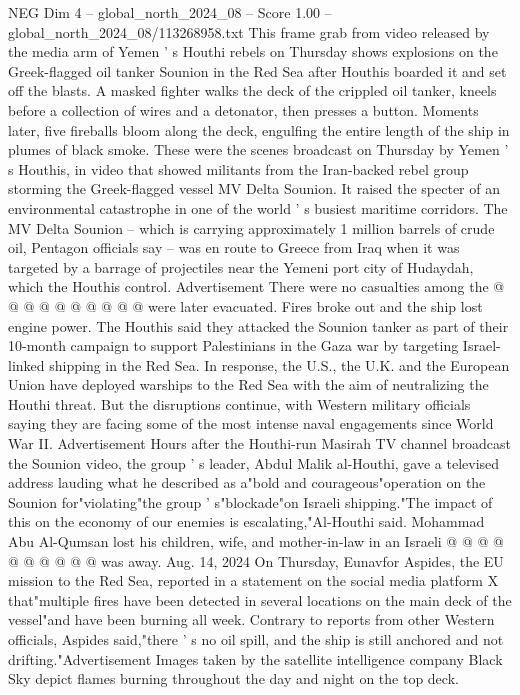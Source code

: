 \begin{textsample}{NEG Dim 4 – global\_north\_2024\_08 – Score 1.00 – global\_north\_2024\_08/113268958.txt}  \label{ex:f4_neg_295}
This frame grab from video released by the media arm of Yemen ' s Houthi rebels on Thursday shows explosions on the Greek-flagged oil tanker Sounion in the Red Sea after Houthis boarded it and set off the blasts.
A masked fighter walks the deck of the crippled oil tanker, kneels before a collection of wires and a detonator, then presses a button.
Moments later, five fireballs bloom along the deck, engulfing the entire length of the ship in plumes of black smoke.
These were the scenes broadcast on Thursday by Yemen ' s Houthis, in video that showed militants from the Iran-backed rebel group storming the Greek-flagged vessel MV Delta Sounion.
It raised the specter of an environmental catastrophe in one of the world ' s busiest maritime corridors.
The MV Delta Sounion -- which is carrying approximately 1 million barrels of crude oil, Pentagon officials say -- was en route to Greece from Iraq when it was targeted by a barrage of projectiles near the Yemeni port city of Hudaydah, which the Houthis control.
Advertisement There were no casualties among the @ @ @ @ @ @ @ @ @ @ were later evacuated.
Fires broke out and the ship lost engine power.
The Houthis said they attacked the Sounion tanker as part of their 10-month campaign to support Palestinians in the Gaza war by targeting Israel-linked shipping in the Red Sea.
In response, the U.S., the U.K. and the European Union have deployed warships to the Red Sea with the aim of neutralizing the Houthi threat.
But the disruptions continue, with Western military officials saying they are facing some of the most intense naval engagements since World War II.
Advertisement Hours after the Houthi-run Masirah TV channel broadcast the Sounion video, the group ' s leader, Abdul Malik al-Houthi, gave a televised address lauding what he described as a"bold and courageous"operation on the Sounion for"violating"the group ' s"blockade"on Israeli shipping."The impact of this on the economy of our enemies is escalating,"Al-Houthi said.
Mohammad Abu Al-Qumsan lost his children, wife, and mother-in-law in an Israeli @ @ @ @ @ @ @ @ @ @ was away.
Aug. 14, 2024 On Thursday, Eunavfor Aspides, the EU mission to the Red Sea, reported in a statement on the social media platform X that"multiple fires have been detected in several locations on the main deck of the vessel"and have been burning all week.
Contrary to reports from other Western officials, Aspides said,"there ' s no oil spill, and the ship is still anchored and not drifting."Advertisement Images taken by the satellite intelligence company Black Sky depict flames burning throughout the day and night on the top deck.

\end{textsample}

